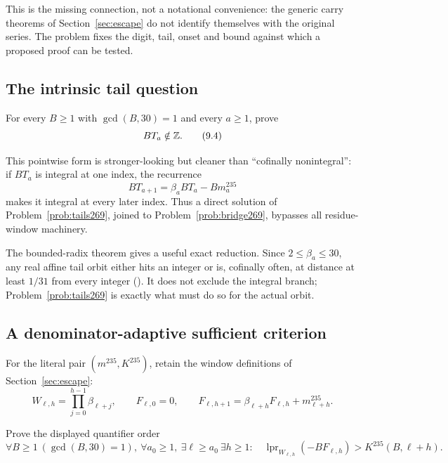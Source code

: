 \documentclass[11pt]{article}
\begin{document}
This is the missing connection, not a notational convenience: the generic
carry theorems of Section~\ref{sec:escape} do not identify themselves with the
original series.  The problem fixes the digit, tail, onset and bound against
which a proposed proof can be tested.

\subsection{The intrinsic tail question}

\begin{problem}\label{prob:tails269}
For every $B\ge1$ with $\gcd(B,30)=1$ and every $a\ge1$, prove
\[
 BT_a\notin\Z.
\tag{9.4}\label{eq:tail-nonintegrality}
\]
\end{problem}

This pointwise form is stronger-looking but cleaner than “cofinally
nonintegral”: if $BT_a$ is integral at one index, the recurrence
\[
 BT_{a+1}=\beta_aBT_a-Bm_a^{235}
\]
makes it integral at every later index.  Thus a direct solution of
Problem~\ref{prob:tails269}, joined to Problem~\ref{prob:bridge269}, bypasses
all residue-window machinery.

The bounded-radix theorem gives a useful exact reduction.  Since
$2\le\beta_a\le30$, any real affine tail orbit either hits an integer or is,
cofinally often, at distance at least $1/31$ from every integer
().
It does not exclude the integral branch; Problem~\ref{prob:tails269} is exactly
what must do so for the actual orbit.

\subsection{A denominator-adaptive sufficient criterion}

For the literal pair $(m^{235},K^{235})$, retain the window definitions of
Section~\ref{sec:escape}:
\[
 W_{\ell,h}=\prod_{j=0}^{h-1}\beta_{\ell+j},\qquad
 F_{\ell,0}=0,\qquad
 F_{\ell,h+1}=\beta_{\ell+h}F_{\ell,h}+m_{\ell+h}^{235}.
\]

\begin{problem}\label{prob:producer}
Prove the displayed quantifier order
\[
 \forall B\ge1\ (\gcd(B,30)=1),\ \forall a_0\ge1,\
 \exists\ell\ge a_0\ \exists h\ge1:\quad
 \operatorname{lpr}_{W_{\ell,h}}(-BF_{\ell,h})
   >K^{235}(B,\ell+h).
\tag{9.5}\label{eq:actual-escape}
\]
\end{problem}
\end{document}
